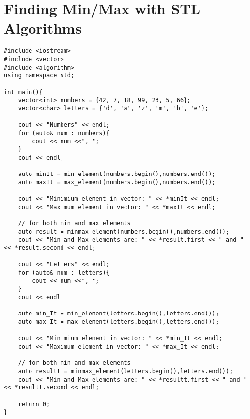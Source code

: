 \documentclass[12pt]{article}
\begin{document}
\section*{Finding Min/Max with STL Algorithms}
\begin{verbatim}
#include <iostream>
#include <vector>
#include <algorithm>
using namespace std;

int main(){
    vector<int> numbers = {42, 7, 18, 99, 23, 5, 66};
    vector<char> letters = {'d', 'a', 'z', 'm', 'b', 'e'};

    cout << "Numbers" << endl;
    for (auto& num : numbers){
        cout << num <<", ";
    }
    cout << endl;

    auto minIt = min_element(numbers.begin(),numbers.end());
    auto maxIt = max_element(numbers.begin(),numbers.end());

    cout << "Minimium element in vector: " << *minIt << endl;
    cout << "Maximum element in vector: " << *maxIt << endl;

    // for both min and max elements
    auto result = minmax_element(numbers.begin(),numbers.end());
    cout << "Min and Max elements are: " << *result.first << " and " << *result.second << endl;

    cout << "Letters" << endl;
    for (auto& num : letters){
        cout << num <<", ";
    }
    cout << endl;

    auto min_It = min_element(letters.begin(),letters.end());
    auto max_It = max_element(letters.begin(),letters.end());

    cout << "Minimium element in vector: " << *min_It << endl;
    cout << "Maximum element in vector: " << *max_It << endl;

    // for both min and max elements
    auto resultt = minmax_element(letters.begin(),letters.end());
    cout << "Min and Max elements are: " << *resultt.first << " and " << *resultt.second << endl;

    return 0;
}
\end{verbatim}
\end{document}
